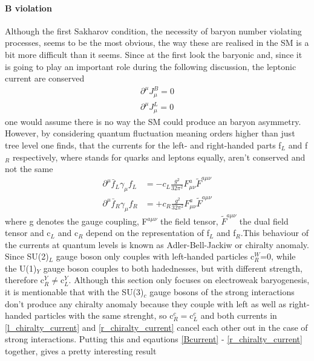 \paragraph{B violation}
Although the first Sakharov condition, the necessity of baryon number violating processes, seems to be the most obvious, the way these are realised in the SM is a bit more difficult than it seems. \newline
Since at the first look the baryonic and, since it is going to play an important role during the following discussion, the leptonic current are  conserved
\begin{align}
	\partial^\mu J_\mu^B=0
	\label{Bcurrent}
	\\
	\partial^\mu J_\mu^L=0
	\label{Lcurrent}
\end{align}
one would assume there is no way the SM could produce an baryon asymmetry. However, by considering quantum fluctuation meaning orders higher than just tree level one finds, that the currents for the left- and right-handed parts f$_L$ and f$_R$ respectively, where stands for quarks and leptons equally, aren't conserved and not the same \cite{Bernreuther:2002uj}
\begin{align}
	\partial^\mu\bar{f}_L\gamma_\mu f_L&=-c_L\frac{g^2}{32\pi^2}F^a_{\mu\nu}\tilde{F}^{a\mu\nu}
	\label{l_chiralty_current}
	\\
	\partial^\mu\bar{f}_R\gamma_\mu f_R&=+c_R\frac{g^2}{32\pi^2}F^a_{\mu\nu}\tilde{F}^{a\mu\nu}
	\label{r_chiralty_current}
\end{align}
where g denotes the gauge coupling, F$^{a\mu\nu}$ the field tensor, $\tilde{F}^{a\mu\nu}$ the dual field tensor and c$_L$ and c$_R$ depend on the representation of f$_L$ and f$_R$.This behaviour of the currents at quantum levels is known as Adler-Bell-Jackiw or chiralty anomaly. 
Since SU(2)$_L$ gauge boson only couples with left-handed particles c$_R^W$=0, while the U(1)$_Y$ gauge boson couples to both hadednesses, but with different strength, therefore c$_R^Y\neq$c$_L^Y$. Although this section only focuses on electroweak baryogenesis, it is mentionable that with the SU(3)$_c$ gauge bosons of the strong interactions don't produce any chiralty anomaly because they couple with left as well as right-handed particles with the same strenght, so c$_R^c=$c$_L^c$ and both currents in \eqref{l_chiralty_current} and \eqref{r_chiralty_current} cancel each other out in the case of strong interactions. \newline
Putting this and eqautions \ref{Bcurrent} - \ref{r_chiralty_current} together, gives a pretty interesting result
